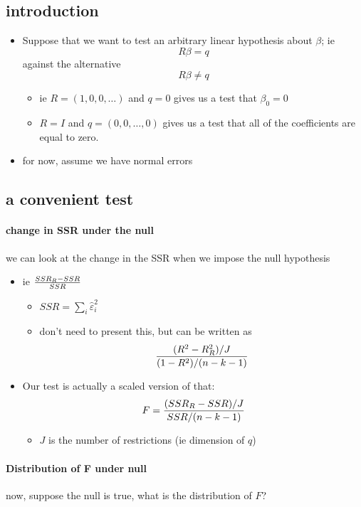 \subsection{introduction}

\begin{itemize}
\item Suppose that we want to test an arbitrary linear hypothesis about
       $\beta$; ie \[R \beta = q\] against the alternative \[R \beta \neq q\]
\begin{itemize}
\item ie $R = (1, 0, 0, \dots)$ and $q = 0$ gives us a test that
         $\beta_0 = 0$
\item $R = I$ and $q = (0,0,\dots,0)$ gives us a test that all of the
         coefficients are equal to zero.
\end{itemize}
\item for now, assume we have normal errors
\end{itemize}

\subsection{a convenient test}

\paragraph{change in SSR under the null}
      we can look at the change in the SSR when we impose the null
        hypothesis
\begin{itemize}
\item ie ${SSR_R - SSR \over SSR}$
\begin{itemize}
\item $SSR = \sum_i \hat\varepsilon_i^2$
\item don't need to present this, but can be written as \[
            {(R^2 - R^2_R) / J \over (1-R^2) / (n-k-1)} \]
\end{itemize}
\item Our test is actually a scaled version of that:
          \[ F = {(SSR_R - SSR)/J \over SSR / (n-k-1)} \]
\begin{itemize}
\item $J$ is the number of restrictions (ie dimension of $q$)
\end{itemize}
\end{itemize}

\paragraph{Distribution of F under null}
      now, suppose the null is true, what is the distribution of $F$?

